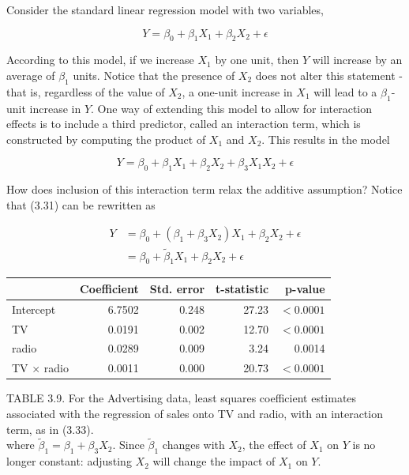 \documentclass[10pt]{article}
\begin{document}
Consider the standard linear regression model with two variables,

$$
Y=\beta_{0}+\beta_{1} X_{1}+\beta_{2} X_{2}+\epsilon
$$

According to this model, if we increase $X_{1}$ by one unit, then $Y$ will increase by an average of $\beta_{1}$ units. Notice that the presence of $X_{2}$ does not alter this statement - that is, regardless of the value of $X_{2}$, a one-unit increase in $X_{1}$ will lead to a $\beta_{1}$-unit increase in $Y$. One way of extending this model to allow for interaction effects is to include a third predictor, called an interaction term, which is constructed by computing the product of $X_{1}$ and $X_{2}$. This results in the model


\begin{equation*}
Y=\beta_{0}+\beta_{1} X_{1}+\beta_{2} X_{2}+\beta_{3} X_{1} X_{2}+\epsilon \tag{3.31}
\end{equation*}


How does inclusion of this interaction term relax the additive assumption? Notice that (3.31) can be rewritten as


\begin{align*}
Y & =\beta_{0}+\left(\beta_{1}+\beta_{3} X_{2}\right) X_{1}+\beta_{2} X_{2}+\epsilon  \tag{3.32}\\
& =\beta_{0}+\tilde{\beta}_{1} X_{1}+\beta_{2} X_{2}+\epsilon
\end{align*}


\begin{center}
\begin{tabular}{l|rrrr}
\hline
 & Coefficient & Std. error & t-statistic & p-value \\
\hline
Intercept & 6.7502 & 0.248 & 27.23 & $<0.0001$ \\
TV & 0.0191 & 0.002 & 12.70 & $<0.0001$ \\
radio & 0.0289 & 0.009 & 3.24 & 0.0014 \\
TV $\times$ radio & 0.0011 & 0.000 & 20.73 & $<0.0001$ \\
\hline
\end{tabular}
\end{center}

TABLE 3.9. For the Advertising data, least squares coefficient estimates associated with the regression of sales onto TV and radio, with an interaction term, as in (3.33).\\
where $\tilde{\beta}_{1}=\beta_{1}+\beta_{3} X_{2}$. Since $\tilde{\beta}_{1}$ changes with $X_{2}$, the effect of $X_{1}$ on $Y$ is no longer constant: adjusting $X_{2}$ will change the impact of $X_{1}$ on $Y$.
\end{document}
